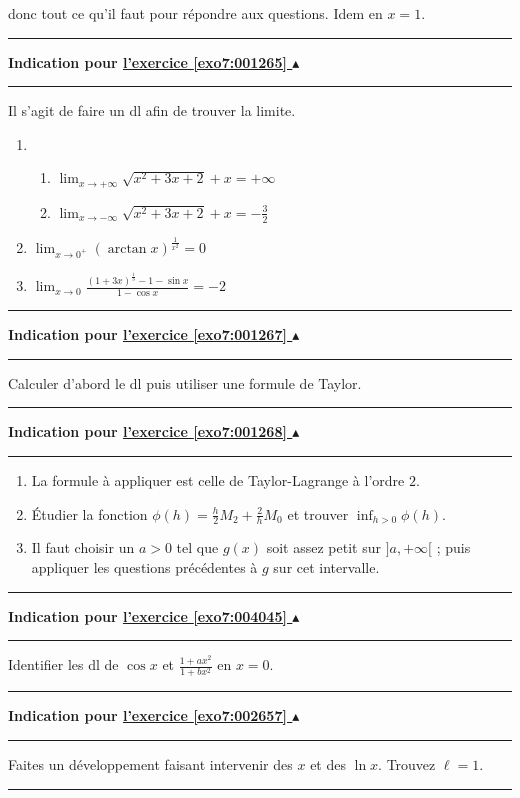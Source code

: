 \documentclass[11pt,a4paper]{article}
\newcommand{\Arctan}{\mathop{\mathrm{arctan}}\nolimits}
\newcommand{\noindication}{}
\newcounter{exo}
\newcommand{\indication}[1]{\hypertarget{ind7:#1}{}\label{ind7:#1}{\bf Indication pour \hyperlink{exo7:#1}{l'exercice \ref{exo7:#1} $\blacktriangle$}}\vspace{1mm}\hrule\vspace{1mm}}
\newcommand{\finindication}{\vspace{1mm}\hrule\vspace*{7mm}}
\begin{document}
donc tout ce qu'il faut pour répondre aux questions. Idem en $x=1$.
\finindication
\indication{001265}
Il s'agit de faire un dl afin de trouver la limite.
\begin{enumerate}
  \item 
  \begin{enumerate}
    \item $\displaystyle \lim_{x \rightarrow +\infty} \sqrt {x^2+3x+2} +x = + \infty$
    \item $\displaystyle \lim_{x \rightarrow -\infty} \sqrt {x^2+3x+2} +x = -\frac32$
  \end{enumerate}
  \item $\displaystyle \lim_{x \rightarrow 0^+}(\Arctan x )^{\frac{1}{x^2}}=0$
  \item $\displaystyle \lim_{x \rightarrow 0} \frac{(1+3x)^{\frac{1}{3}}-1-\sin x}{1-\cos x}=-2$
\end{enumerate}

\finindication
\indication{001267}
Calculer d'abord le dl puis utiliser une formule de Taylor.
\finindication
\indication{001268}
\begin{enumerate}
  \item La formule à appliquer est celle de Taylor-Lagrange à l'ordre $2$.
  \item \'Etudier la fonction $\phi(h) = \frac{h}{2}M_2+\frac{2}{h}M_0$ et trouver $\inf_{h>0} \phi(h)$.
  \item Il faut choisir un $a>0$ tel que $g(x)$ soit assez petit sur $]a,+\infty[$ ; puis appliquer
les questions précédentes à $g$ sur cet intervalle.
\end{enumerate}
\finindication
\noindication
\noindication
\indication{004045}
Identifier les dl de $\cos x$ et $\frac{1+ax^2}{1+bx^2}$ en $x=0$.
\finindication
\indication{002657}
Faites un développement faisant intervenir des $x$ et des $\ln x$.
Trouvez $\ell=1$.
\finindication


\newpage
\end{document}
